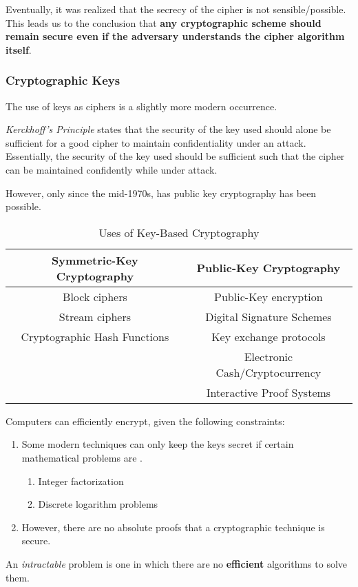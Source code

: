 Eventually, it was realized that the secrecy of the cipher is not sensible/possible.
This leads us to the conclusion that \textbf{any cryptographic scheme should remain secure even if the adversary understands the cipher algorithm itself}.

\subsubsection{Cryptographic Keys}\label{subsubsec:Cryptographic_Keys}
The use of keys as ciphers is a slightly more modern occurrence.
\begin{definition}\label{def:Kerckhoffs_Principle}
  \emph{Kerckhoff's Principle} states that the security of the key used should alone be sufficient for a good cipher to maintain confidentiality under an attack.
  Essentially, the security of the key used should be sufficient such that the cipher can be maintained confidently while under attack.
\end{definition}

However, only since the mid-1970s, has public key cryptography has been possible.

\begin{table}[h!]
  \centering
  \begin{tabular}{cc}
    \toprule
    Symmetric-Key Cryptography & Public-Key Cryptography \\
    \midrule
    Block ciphers & Public-Key encryption \\
    Stream ciphers & Digital Signature Schemes \\
    Cryptographic Hash Functions & Key exchange protocols \\
                               & Electronic Cash/Cryptocurrency \\
                               & Interactive Proof Systems \\
    \bottomrule
  \end{tabular}
  \caption{Uses of Key-Based Cryptography}
  \label{tab:Key_Cryptography_Uses}
\end{table}

Computers can efficiently encrypt, given the following constraints:
\begin{enumerate}[noitemsep]
\item Some modern techniques can only keep the keys secret if certain mathematical problems are .
  \begin{enumerate}[noitemsep]
  \item Integer factorization
  \item Discrete logarithm problems
  \end{enumerate}
\item However, there are no absolute proofs that a cryptographic technique is secure.
\end{enumerate}

\begin{definition}[Intractable]\label{def:Intractable}
  An \emph{intractable} problem is one in which there are no \textbf{efficient} algorithms to solve them.
\end{definition}

